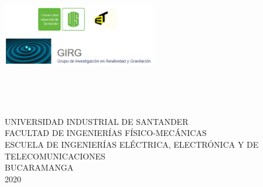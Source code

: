 \noindent \begin{center}
\textbf{\large ~}
\par\end{center}{\large \par}

\begin{center}%
  \includegraphics[width=0.5\textwidth]{Images/UIS_e3t_GIRG}\\
\end{center}

\noindent \begin{center}
\textbf{\large ~}
\par\end{center}{\large \par}

\noindent \begin{center}
\textbf{\large ~}
\par\end{center}{\large \par}

\noindent \begin{center}%
{\large UNIVERSIDAD INDUSTRIAL DE SANTANDER
}\\
{\large FACULTAD DE INGENIERÍAS FÍSICO-MECÁNICAS}\\ %
{\large ESCUELA DE INGENIERÍAS ELÉCTRICA, ELECTRÓNICA Y DE TELECOMUNICACIONES}\\ %
{\large BUCARAMANGA}\\%
{\large 2020}%
\par\end{center}{\large \par}

\thispagestyle{empty} %
